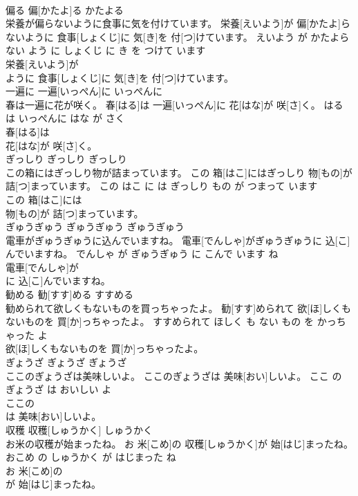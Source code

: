 \documentclass[8pt]{extreport}
\begin{document}
\begin{CJK}{UTF8}{min}
\\	偏る	偏[かたよ]る	かたよる	
\\	栄養が偏らないように食事に気を付けています。	栄養[えいよう]が 偏[かたよ]らないように 食事[しょくじ]に 気[き]を 付[つ]けています。	えいよう が かたよらない よう に しょくじ に き を つけて います	
\\	栄養[えいよう]が
\\	ように 食事[しょくじ]に 気[き]を 付[つ]けています。			
\\	一遍に	一遍[いっぺん]に	いっぺんに	
\\	春は一遍に花が咲く。	春[はる]は 一遍[いっぺん]に 花[はな]が 咲[さ]く。	はる は いっぺんに はな が さく	
\\	春[はる]は
\\	花[はな]が 咲[さ]く。			
\\	ぎっしり	ぎっしり	ぎっしり	
\\	この箱にはぎっしり物が詰まっています。	この 箱[はこ]にはぎっしり 物[もの]が 詰[つ]まっています。	この はこ に は ぎっしり もの が つまって います	
\\	この 箱[はこ]には
\\	物[もの]が 詰[つ]まっています。			
\\	ぎゅうぎゅう	ぎゅうぎゅう	ぎゅうぎゅう	
\\	電車がぎゅうぎゅうに込んでいますね。	電車[でんしゃ]がぎゅうぎゅうに 込[こ]んでいますね。	でんしゃ が ぎゅうぎゅう に こんで います ね	
\\	電車[でんしゃ]が
\\	に 込[こ]んでいますね。			
\\	勧める	勧[すす]める	すすめる	
\\	勧められて欲しくもないものを買っちゃったよ。	勧[すす]められて 欲[ほ]しくもないものを 買[か]っちゃったよ。	すすめられて ほしく も ない もの を かっちゃった よ	
\\	欲[ほ]しくもないものを 買[か]っちゃったよ。			
\\	ぎょうざ	ぎょうざ	ぎょうざ	
\\	ここのぎょうざは美味しいよ。	ここのぎょうざは 美味[おい]しいよ。	ここ の ぎょうざ は おいしい よ	
\\	ここの
\\	は 美味[おい]しいよ。			
\\	収穫	収穫[しゅうかく]	しゅうかく	
\\	お米の収穫が始まったね。	お 米[こめ]の 収穫[しゅうかく]が 始[はじ]まったね。	おこめ の しゅうかく が はじまった ね	
\\	お 米[こめ]の
\\	が 始[はじ]まったね。			

\end{CJK}
\end{document}
